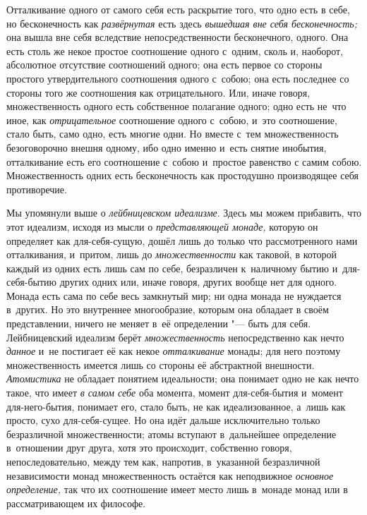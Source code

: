 Отталкивание одного от самого себя есть раскрытие того, что одно есть в
себе, но бесконечность как {\em развёрнутая} есть здесь
{\em вышедшая вне себя бесконечность;} она вышла вне
себя вследствие непосредственности бесконечного, одного. Она есть столь же
некое простое соотношение одного с~одним, сколь и, наоборот, абсолютное
отсутствие соотношений одного; она есть первое со стороны простого
утвердительного соотношения одного с~собою; она есть последнее со стороны
того же соотношения как отрицательного. Или, иначе говоря, множественность
одного есть собственное полагание одного; одно есть не~что иное, как
{\em отрицательное} соотношение одного с~собою, и~это
соотношение, стало быть, само одно, есть многие одни. Но вместе с~тем
множественность безоговорочно внешня одному, ибо одно именно и~есть снятие
инобытия, отталкивание есть его соотношение с~собою и~простое равенство с
самим собою. Множественность одних есть бесконечность как простодушно
производящее себя противоречие.


Мы упомянули выше о {\em лейбницевском идеализме}. Здесь
мы можем прибавить, что этот идеализм, исходя из мысли о
{\em представляющей монаде,} которую он определяет как
для-себя-сущую, дошёл лишь до только что рассмотренного нами отталкивания,
и~притом, лишь до {\em множественности} как таковой, в
которой каждый из одних есть лишь сам по себе, безразличен к~наличному
бытию и~для-себя-бытию других одних или, иначе говоря, других вообще нет
для одного. Монада есть сама по себе весь замкнутый мир; ни одна монада не
нуждается в~других. Но это внутреннее многообразие, которым она обладает в
своём представлении, ничего не меняет в~её определении "--- быть для себя.
Лейбницевский идеализм берёт {\em множественность}
непосредственно как нечто {\em данное} и~не постигает
её как некое {\em отталкивание} монады; для него
поэтому множественность имеется лишь со стороны её абстрактной внешности.
{\em Атомистика} не обладает понятием идеальности; она
понимает одно не как нечто такое, что имеет {\em в
самом себе} оба момента, момент для-себя-бытия и~момент для-него-бытия,
понимает его, стало быть, не как идеализованное, а~лишь как просто, сухо
для-себя-сущее. Но она идёт дальше исключительно только безразличной
множественности; атомы вступают в~дальнейшее определение в~отношении друг
друга, хотя это происходит, собственно говоря, непоследовательно, между тем
как, напротив, в~указанной безразличной независимости монад множественность
остаётся как неподвижное {\em основное определение,}
так что их соотношение имеет место лишь в~монаде монад или в
рассматривающем их философе.

